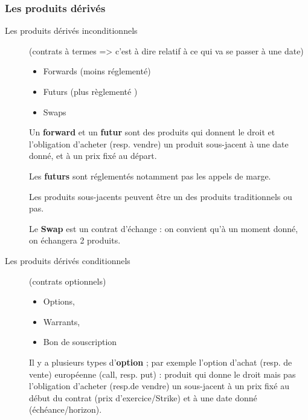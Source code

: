 \documentclass{report}
\begin{document}
\subsubsection{Les produits dérivés}
\begin{description}
    \item [Les produits dérivés inconditionnels] (contrats à termes => c'est à dire relatif à ce qui va se passer à une date)
    \begin{itemize}
        \item Forwards (moins réglementé)
        \item Futurs (plus règlementé )
        \item Swaps
    \end{itemize}
    Un \textbf{forward} et un \textbf{futur} sont des produits qui donnent le droit et l’obligation d’acheter (resp. vendre) un produit sous-jacent à une date donné, et à un prix fixé au départ. 
    
    Les \textbf{futurs} sont réglementés notamment pas les appels de marge. 
    
    Les produits sous-jacents peuvent être un des produits traditionnels ou pas.  
    
    Le \textbf{Swap} est un contrat d’échange :  on convient qu’à un moment donné, on échangera 2 produits. 
    
    \item [Les produits dérivés conditionnels] (contrats optionnels)
    \begin{itemize}
        \item Options,
        \item Warrants,
        \item Bon de souscription
    \end{itemize}

    Il y a plusieurs types d’\textbf{option} ; par exemple l’option d’achat (resp. de vente) européenne (call, resp. put) : produit qui donne le droit mais pas l’obligation d’acheter (resp.de vendre) un sous-jacent à un prix fixé au début du contrat (prix d’exercice/Strike) et à une date donné (échéance/horizon).
\end{description}

\end{document}
